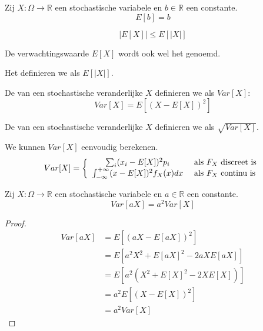 \documentclass[main.tex]{subfiles}
\begin{document}
\begin{ei}
  Zij $X: \Omega \rightarrow \mathbb{R}$ een stochastische variabele en $b\in \mathbb{R}$ een constante.
  \[ E[b] = b \]
\end{ei}

\begin{ei}
  \[ |E[X]| \le E[|X|] \]
\end{ei}

\begin{de}
  De verwachtingswaarde $E[X]$ wordt ook wel het  genoemd.
\end{de}

\begin{de}
  Het  definieren we als $E[|X|]$.
\end{de}

\begin{de}
  De  van een stochastische veranderlijke $X$ definieren we als $Var[X]$:
  \[ Var[X] = E[(X-E[X])^{2}] \]
\end{de}

\begin{de}
  De  van een stochastische veranderlijke $X$ definieren we als $\sqrt{Var[X]}$.
\end{de}

\begin{st}
  We kunnen $Var[X]$ eenvoudig berekenen.
  \[
  Var[X]
  =
  \left\{
    \begin{array}{c l}
      \sum_{i}(x_{i}-E[X])^{2}p_{i} &\text{ als } F_{X} \text{ discreet is} \\
      \int_{-\infty}^{+\infty}(x-E[X])^{2}f_{X}(x)dx &\text{ als } F_{X} \text{ continu is} 
    \end{array}
  \right.
  \]
\end{st}

\begin{ei}
  Zij $X: \Omega \rightarrow \mathbb{R}$ een stochastische variabele en $a\in \mathbb{R}$ een constante.
  \[ Var[aX] = a^{2}Var[X] \]

  \begin{proof}
    \begin{align*}
      Var[aX]
      &= E\left[\left(aX - E[aX]\right)^{2}\right]\\
      &= E\left[a^{2}X^{2} + E[aX]^{2} - 2aXE[aX]\right]\\
      &= E\left[a^{2}\left(X^{2}+E[X]^{2} - 2XE[X]\right)\right]\\
      &= a^{2}E\left[\left(X - E[X]\right)^{2}\right]\\
      &= a^{2}Var[X]
    \end{align*}
  \end{proof}
\end{ei}
\end{document}
